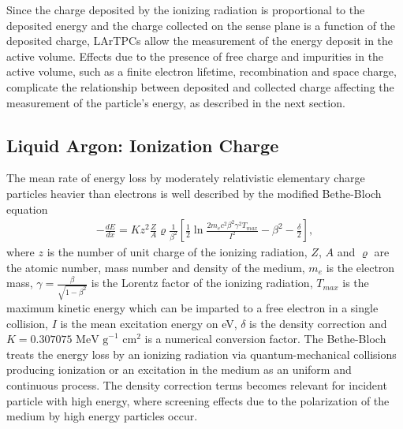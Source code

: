 Since the charge deposited by the ionizing radiation is proportional to the deposited energy and the charge collected on the sense plane is a function of the deposited charge, LArTPCs allow the measurement of the energy deposit in the active volume. Effects due to the presence of free charge and impurities in the active volume, such as a finite electron lifetime, recombination and space charge, complicate the relationship between deposited and collected charge affecting the measurement of the particle's energy, as described in the next section.
 
\subsection{Liquid Argon: Ionization Charge}\label{sec:charge}
The mean rate of energy loss by moderately relativistic elementary charge particles heavier than electrons is well described by the modified Bethe-Bloch \cite{Patrignani:2016xqp} equation
\begin{eqnarray}
			- \frac{dE}{dx} = K z^2 \frac{Z}{A} \varrho \frac{1}{\beta^2} \left[ \frac{1}{2} \ln{\frac{2 m_e c^2 \beta^2 \gamma^2 T_{max}}{I^2}} - \beta^2 - \frac{\delta}{2}\right] ,
			\label{eq:BB}
\end{eqnarray}
where  $z$ is the number of unit charge of the ionizing radiation, $Z$, $A$  and $\varrho$ are the atomic number, mass number and density of the medium,  $m_e$  is the electron mass, $\gamma = \frac{\beta}{\sqrt{1-\beta^2}} $ is the Lorentz factor of the ionizing radiation,  $T_{max}$ is the maximum kinetic energy which can be
imparted to a free electron in a single collision, $I$ is the mean excitation energy on eV,  $\delta$ is the  density correction and $K = 0.307 075 \text{ MeV g}^{-1}\text{ cm}^2$ is a numerical conversion factor. The Bethe-Bloch treats the energy loss by an ionizing radiation via quantum-mechanical collisions producing ionization or an excitation in the medium as an uniform and continuous process. The density correction  terms becomes relevant for incident particle with high energy, where screening effects due to the polarization of the medium by high energy particles occur.


